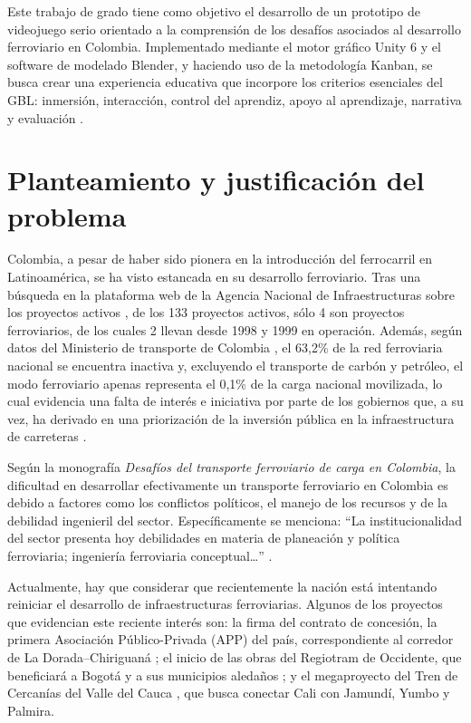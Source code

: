 Este trabajo de grado tiene como objetivo el desarrollo de un prototipo de videojuego serio orientado a la comprensión de los desafíos asociados al desarrollo ferroviario en Colombia. Implementado mediante el motor gráfico Unity 6 y el software de modelado Blender, y haciendo uso de la metodología Kanban, se busca crear una experiencia educativa que incorpore los criterios esenciales del GBL: inmersión, interacción, control del aprendiz, apoyo al aprendizaje, narrativa y evaluación \autocite{gblFrameworkExamining} .

\section{Planteamiento y justificación del problema}
Colombia, a pesar de haber sido pionera en la introducción del ferrocarril en Latinoamérica, se ha visto estancada en su desarrollo ferroviario. Tras una búsqueda en la plataforma web de la Agencia Nacional de Infraestructuras sobre los proyectos activos \autocite{aniProyectos}, de los 133 proyectos activos, sólo 4 son proyectos ferroviarios, de los cuales 2 llevan desde 1998 y 1999 en operación. Además, según datos del Ministerio de transporte de Colombia \autocite{mintransporteSurcos2024}, el 63,2\% de la red ferroviaria nacional se encuentra inactiva y, excluyendo el transporte de carbón y petróleo, el modo ferroviario apenas representa el 0,1\% de la carga nacional movilizada, lo cual evidencia una falta de interés e iniciativa por parte de los gobiernos que, a su vez, ha derivado en una priorización de la inversión pública en la infraestructura de carreteras \autocite{mintransporteDatosCarga}.

Según la monografía \textit{Desafíos del transporte ferroviario de carga en Colombia}, la dificultad en desarrollar efectivamente un transporte ferroviario en Colombia es debido a factores como los conflictos políticos, el manejo de los recursos y de la debilidad ingenieril del sector. Específicamente se menciona: “La institucionalidad del sector presenta hoy debilidades en materia de planeación y política ferroviaria; ingeniería ferroviaria conceptual…” \autocite[p.~17]{iabdDesafios}.

Actualmente, hay que considerar que recientemente la nación está intentando reiniciar el desarrollo de infraestructuras ferroviarias. Algunos de los proyectos que evidencian este reciente interés son: la firma del contrato de concesión, la primera Asociación Público-Privada (APP) del país, correspondiente al corredor de La Dorada–Chiriguaná \autocite{mintransporteAPP2025}; el inicio de las obras del Regiotram de Occidente, que beneficiará a Bogotá y a sus municipios aledaños \autocite{bogotaRegiotram2025}; y el megaproyecto del Tren de Cercanías del Valle del Cauca \autocite{valoraTrenValle2024}, que busca conectar Cali con Jamundí, Yumbo y Palmira.

